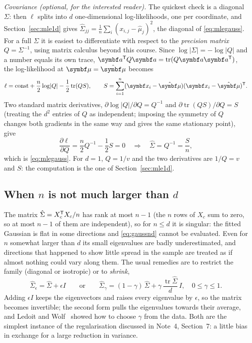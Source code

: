 \documentclass[11pt]{article}
\begin{document}
\emph{Covariance (optional, for the interested reader).} The quickest check is a diagonal $\Sigma$: then $\ell$
splits into $d$ one-dimensional log-likelihoods, one per coordinate, and Section~\ref{sec:mle1d} gives
$\hat\Sigma_{jj} = \frac1n\sum_i (x_{i,j} - \hat\mu_j)^2$, the diagonal of \eqref{eq:mlegauss}. For a full $\Sigma$ it
is easiest to differentiate with respect to the \emph{precision matrix} $Q = \Sigma^{-1}$, using matrix calculus beyond
this course. Since $\log\lvert\Sigma\rvert = -\log\lvert Q\rvert$ and a number equals its own trace, $\vect{a}\T Q\vect{a} =
\operatorname{tr}(Q\vect{a}\vect{a}\T)$, the log-likelihood at $\vmu = \hat{\vmu}$ becomes
\[
  \ell = \text{const} + \frac{n}{2}\log\lvert Q\rvert - \frac12\operatorname{tr}(Q S), \qquad
  S = \sum_{i=1}^n (\x_i - \hat{\vmu})(\x_i - \hat{\vmu})\T .
\]
Two standard matrix derivatives, $\partial\log\lvert Q\rvert/\partial Q = Q^{-1}$ and
$\partial\operatorname{tr}(QS)/\partial Q = S$ (treating the $d^2$ entries of $Q$ as independent; imposing the
symmetry of $Q$ changes both gradients in the same way and gives the same stationary point), give
\[
  \frac{\partial\ell}{\partial Q} = \frac n2 Q^{-1} - \frac12 S = 0 \quad\Longrightarrow\quad
  \hat\Sigma = Q^{-1} = \frac{S}{n},
\]
which is \eqref{eq:mlegauss}. For $d = 1$, $Q = 1/v$ and the two derivatives are $1/Q = v$ and $S$: the
computation is the one of Section~\ref{sec:mle1d}.

\subsection{When \texorpdfstring{$n$}{n} is not much larger than \texorpdfstring{$d$}{d}}\label{sec:shrinkage}

The matrix $\hat\Sigma = X_c^{\mathsf{T}} X_c / n$ has rank at most $n - 1$ (the $n$ rows of $X_c$ sum to zero, so at most $n - 1$
of them are independent), so for $n \le d$ it is singular: the fitted Gaussian is flat in some directions and
\eqref{eq:gaussnd} cannot be evaluated. Even for $n$ somewhat larger than $d$ its small eigenvalues are badly
underestimated, and directions that happened to show little spread in the sample are treated as if almost nothing
could vary along them. The usual remedies are to restrict the family (diagonal or isotropic) or to \emph{shrink},
\[
  \hat\Sigma_\epsilon = \hat\Sigma + \epsilon I \qquad\text{or}\qquad
  \hat\Sigma_\gamma = (1 - \gamma)\,\hat\Sigma + \gamma\,\frac{\operatorname{tr}\hat\Sigma}{d}\,I, \quad 0 \le \gamma \le 1 .
\]
Adding $\epsilon I$ keeps the eigenvectors and raises every eigenvalue by $\epsilon$, so the matrix becomes
invertible; the second form pulls the eigenvalues towards their average, and Ledoit and Wolf~\cite{ledoit2004} showed
how to choose $\gamma$ from the data. Both are the simplest instance of the regularisation discussed in Note~4,
Section~7: a little bias in exchange for a large reduction in variance.
\end{document}
